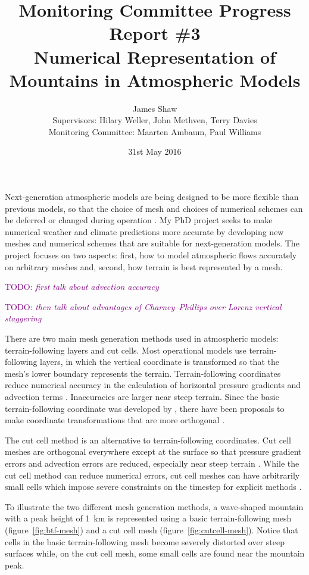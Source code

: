 \documentclass[a4paper,11pt]{article}
\title{Monitoring Committee Progress Report \#3\\
\vspace*{1em}
\Large{Numerical Representation of Mountains in Atmospheric Models}}
\author{James Shaw
\vspace{0.5em} \\
\large{Supervisors: Hilary Weller, John Methven, Terry Davies}
\vspace{0.5em} \\
\large{Monitoring Committee: Maarten Ambaum, Paul Williams}}
\date{31st May 2016}
\newcommand{\TODO}[1]{\textcolor{purple}{TODO: \emph{#1}}}
\begin{document}
\newcommand{\exner}{\Pi}
\maketitle

Next-generation atmospheric models are being designed to be more flexible than previous models, so that the choice of mesh and choices of numerical schemes can be deferred or changed during operation \citep{ford2013,theurich2015}.
My PhD project seeks to make numerical weather and climate predictions more accurate by developing new meshes and numerical schemes that are suitable for next-generation models.
The project focuses on two aspects: first, how to model atmospheric flows accurately on arbitrary meshes and, second, how terrain is best represented by a mesh.

\TODO{first talk about advection accuracy}

\TODO{then talk about advantages of Charney--Phillips over Lorenz vertical staggering}

There are two main mesh generation methods used in atmospheric models: terrain-following layers and cut cells.
Most operational models use terrain-following layers, in which the vertical coordinate is transformed so that the mesh's lower boundary represents the terrain.
Terrain-following coordinates reduce numerical accuracy in the calculation of horizontal pressure gradients \citep{gary1973,zaengl2012} and advection terms \citep{schaer2002}.  Inaccuracies are larger near steep terrain.  Since the basic terrain-following coordinate was developed by \citet{galchen-somerville1975a}, there have been proposals to make coordinate transformations that are more orthogonal \citep{simmons-burridge1981,schaer2002,leuenberger2010,klemp2011}.

The cut cell method is an alternative to terrain-following coordinates.  Cut cell meshes are orthogonal everywhere except at the surface so that pressure gradient errors and advection errors are reduced, especially near steep terrain \citep{lock2012,good2014}.  While the cut cell method can reduce numerical errors, cut cell meshes can have arbitrarily small cells which impose severe constraints on the timestep for explicit methods \citep{almgren1997}.

To illustrate the two different mesh generation methods, a wave-shaped mountain with a peak height of \SI{1}{\kilo\meter} is represented using a basic terrain-following mesh (figure~\ref{fig:btf-mesh}) and a cut cell mesh (figure~\ref{fig:cutcell-mesh}).  Notice that cells in the basic terrain-following mesh become severely distorted over steep surfaces while, on the cut cell mesh, some small cells are found near the mountain peak.
\end{document}
